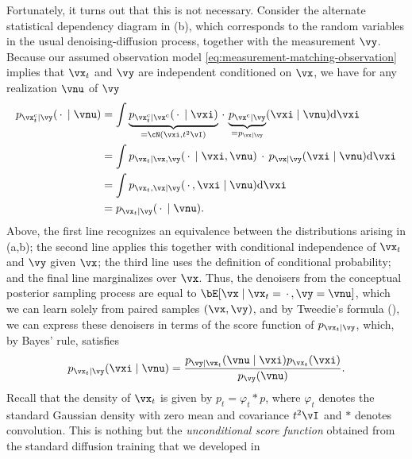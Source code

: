 \documentclass[../../book-main.tex]{subfiles}
\begin{document}
Fortunately, it turns out that this is not necessary.
Consider the alternate statistical dependency diagram in
(b), which corresponds to the random variables
in the usual denoising-diffusion process, together with the measurement $\vy$. 
Because our assumed observation model \eqref{eq:measurement-matching-observation}
implies that $\vx_t$ and $\vy$ are independent conditioned on $\vx$, we have for
any realization $\vnu$ of $\vy$
\begin{equation}\label{eq:conditional-denoising-conditioning-order-irrelevant}
  \begin{split}
  p_{\posteriorsample_t\mid \vy}(\spcdot \mid \vnu)
  &= \int
  \underbrace{p_{\posteriorsample_t \mid \posteriorsample}(\spcdot\mid \vxi)}_{=
  \cN(\vxi, t^2 \vI)}
  \spcdot \underbrace{p_{\posteriorsample \mid \vy}}_{= p_{\vx\mid \vy}}(\vxi \mid
  \vnu)
  \odif \vxi
  \\
  &=
  \int p_{\vx_t \mid \vx, \vy}(\spcdot\mid \vxi, \vnu) \spcdot p_{\vx \mid
  \vy}(\vxi\mid \vnu) \odif \vxi
  \\
  &=
  \int p_{\vx_t, \vx \mid \vy}(\spcdot, \vxi \mid \vnu) \odif \vxi
  \\
  &= p_{\vx_t \mid \vy}(\spcdot\mid \vnu).
  \end{split}
\end{equation}
Above, the first line recognizes an equivalence between the distributions
arising in  (a,b); the second line applies this
together with conditional independence of $\vx_t$ and $\vy$ given $\vx$; the
third line uses the definition of conditional probability; and the final line
marginalizes over $\vx$.
Thus, the denoisers from the conceptual posterior sampling process are equal to
$\bE[\vx \mid \vx_t=\spcdot, \vy=\vnu]$, which we can learn solely from paired samples $(\vx,
\vy)$,
and by Tweedie's formula (), we can express these denoisers in
terms of the score function of $p_{\vx_t \mid \vy}$, which, by Bayes' rule,
satisfies
\begin{equation}
  p_{\vx_t \mid \vy}(\vxi \mid \vnu) 
  = \frac{p_{\vy \mid \vx_t}(\vnu \mid \vxi) p_{\vx_t}(\vxi)}{p_{\vy}(\vnu)}.
\end{equation}
Recall that the density of $\vx_t$ is 
given by $p_t = \varphi_{t} \ast p$, where $\varphi_{t}$ denotes the standard
Gaussian density with zero mean and covariance $t^2 \vI$ and $\ast$ denotes
convolution. This is nothing but the \textit{unconditional score function}
obtained from the standard diffusion training that we developed in
\end{document}
